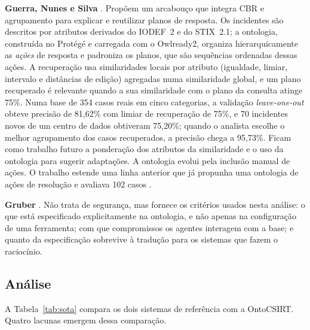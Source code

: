 \documentclass[12pt]{article}
\begin{document}
\textbf{Guerra, Nunes e Silva} \cite{guerra2025cases}. Propõem um arcabouço que integra CBR e agrupamento para explicar e reutilizar planos de resposta. Os incidentes são descritos por atributos derivados do IODEF~2 e do STIX~2.1; a ontologia, construída no Protégé e carregada com o Owlready2, organiza hierarquicamente as \emph{ações} de resposta e padroniza os planos, que são sequências ordenadas dessas ações. A recuperação usa similaridades locais por atributo (igualdade, limiar, intervalo e distâncias de edição) agregadas numa similaridade global, e um plano recuperado é relevante quando a sua similaridade com o plano da consulta atinge 75\%. Numa base de 354 casos reais em cinco categorias, a validação \emph{leave-one-out} obteve precisão de 81,62\% com limiar de recuperação de 75\%, e 70 incidentes novos de um centro de dados obtiveram 75,20\%; quando o analista escolhe o melhor agrupamento dos casos recuperados, a precisão chega a 95,73\%. Ficam como trabalho futuro a ponderação dos atributos da similaridade e o uso da ontologia para sugerir adaptações. A ontologia evolui pela inclusão manual de ações. O trabalho estende uma linha anterior que já propunha uma ontologia de ações de resolução e avaliava 102 casos \cite{guerra2023,nunes2019}.

\textbf{Gruber} \cite{gruber1993}. Não trata de segurança, mas fornece os critérios usados nesta análise: o que está especificado explicitamente na ontologia, e não apenas na configuração de uma ferramenta; com que compromissos os agentes interagem com a base; e quanto da especificação sobrevive à tradução para os sistemas que fazem o raciocínio.

\subsection{Análise}

A Tabela~\ref{tab:sota} compara os dois sistemas de referência com a OntoCSIRT. Quatro lacunas emergem dessa comparação.
\end{document}
